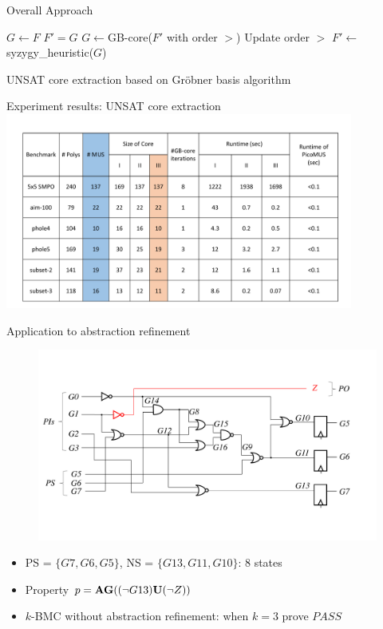 \documentclass[xcolor=dvipsnames]{beamer}
\newcommand{\bi}{\begin{itemize}}
\newcommand{\ei}{\end{itemize}}
\begin{document}
\begin{frame}{\large{Overall Approach}}
\begin{algorithm}[H] %
\SetAlgoNoLine
 $G \gets F$\;
  {
	$F' = G$\;
  	$G \gets $GB-core($F'$ with order $>$)\;
	Update order $>$\;
  }
  $F'\gets$syzygy\_heuristic($G$)\;
\caption {UNSAT core extraction based on Gr\"obner basis algorithm}
\end{algorithm}
\end{frame}

\begin{frame}{\large{Experiment results: UNSAT core extraction}}
\\
\includegraphics[width=4.5in]{./table_cp2016.pdf}

\end{frame}
\begin{frame}{\large{Application to abstraction refinement}}
\vspace{-0.1in}
\begin{figure}
\centering
\includegraphics[scale=0.35]{../newfig/s27.pdf}
\end{figure}
\vspace{-0.3in}
\bi
\item PS = $\{G7,G6,G5\}$, NS = $\{G13,G11,G10\}$: 8 states
\item Property $p = {\bf AG}( (\neg G13) {\bf U} (\neg Z) )$
\item $k$-BMC without abstraction refinement: when $k=3$ prove $PASS$
\ei
\end{frame}
\end{document}

